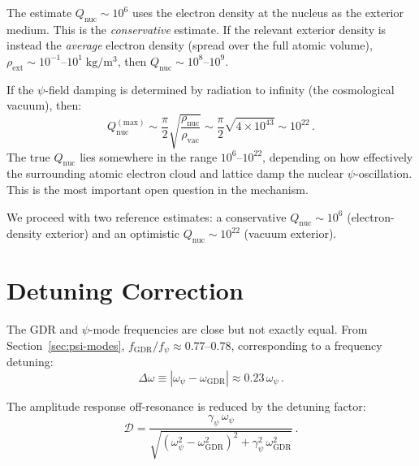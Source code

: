 \documentclass[aps,prd,twocolumn,superscriptaddress,nofootinbib]{revtex4-2}
\newcommand{\ee}[1]{\times 10^{#1}}
\newcommand{\Qnuc}{Q_{\mathrm{nuc}}}
\newcommand{\wGDR}{\omega_{\mathrm{GDR}}}
\newcommand{\wpsi}{\omega_\psi}
\newcommand{\gpsi}{\gamma_\psi}
\newcommand{\fGDR}{f_{\mathrm{GDR}}}
\newcommand{\fpsi}{f_\psi}
\begin{document}
\begin{tcolorbox}[colback=yellow!5!white, colframe=yellow!50!black,
title=Important Caveat on $\Qnuc$]
The estimate $\Qnuc \sim 10^6$ uses the electron density at the
nucleus as the exterior medium.  This is the \emph{conservative}
estimate.  If the relevant exterior density is instead the
\emph{average} electron density (spread over the full atomic volume),
$\rho_{\mathrm{ext}} \sim 10^{-1}$--$10^{1}\;\mathrm{kg/m^3}$,
then $\Qnuc \sim 10^{8}$--$10^{9}$.

If the $\psi$-field damping is determined by radiation to infinity
(the cosmological vacuum), then:
\begin{equation}
\Qnuc^{(\mathrm{max})} \sim \frac{\pi}{2}\sqrt{\frac{\rho_{\mathrm{nuc}}}
{\rho_{\mathrm{vac}}}} \sim \frac{\pi}{2}\sqrt{4\ee{43}}
\sim 10^{22}\,.
\end{equation}
The true $\Qnuc$ lies somewhere in the range $10^6$--$10^{22}$,
depending on how effectively the surrounding atomic electron cloud
and lattice damp the nuclear $\psi$-oscillation.  This is the most
important open question in the mechanism.
\end{tcolorbox}

We proceed with two reference estimates: a conservative $\Qnuc \sim
10^6$ (electron-density exterior) and an optimistic $\Qnuc \sim 10^{22}$
(vacuum exterior).


\section{Detuning Correction}
\label{sec:detuning}

The GDR and $\psi$-mode frequencies are close but not exactly equal.
From Section~\ref{sec:psi-modes}, $\fGDR/\fpsi \approx 0.77$--$0.78$,
corresponding to a frequency detuning:
\begin{equation}
\Delta\omega \equiv |\wpsi - \wGDR| \approx 0.23\,\wpsi\,.
\end{equation}

The amplitude response off-resonance is reduced by the detuning
factor:
\begin{equation}\label{eq:detuning}
\mathcal{D} = \frac{\gpsi\,\wpsi}
{\sqrt{(\wpsi^2 - \wGDR^2)^2 + \gpsi^2\,\wGDR^2}}\,.
\end{equation}
\end{document}
